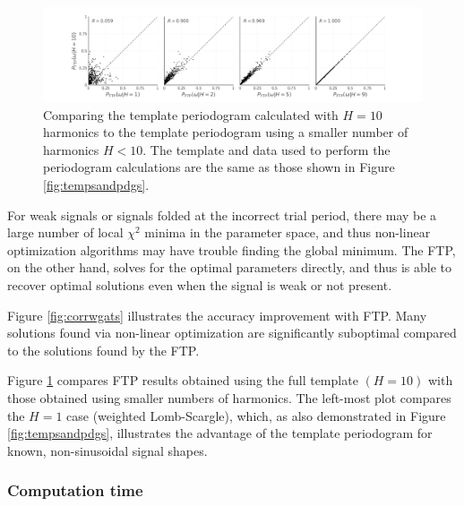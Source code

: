 \documentclass[apj]{emulateapj}
\begin{document}
\begin{figure}
    \centering
    \includegraphics[width=\textwidth]{plots/correlation_with_large_H.pdf}
    \caption{\label{fig:corrwhighh} Comparing the template periodogram calculated with $H=10$ harmonics
            to the template periodogram using a smaller number of harmonics $H < 10$. The template and
            data used to perform the periodogram calculations are the same as those shown in Figure \ref{fig:tempsandpdgs}.}    
\end{figure}

For weak signals or signals folded at the incorrect trial period, there
may be a large number of local $\chi^2$ minima in the parameter space, and thus
non-linear optimization algorithms may have trouble finding the global minimum. The 
FTP, on the other hand, solves for the optimal parameters directly, and
thus is able to recover optimal solutions even when the signal is weak
or not present.

Figure \ref{fig:corrwgats} illustrates the accuracy improvement with FTP.
Many solutions found via non-linear optimization are significantly suboptimal
compared to the solutions found by the FTP.

Figure \ref{fig:corrwhighh} compares FTP results obtained using the full template
$(H=10)$ with those obtained using smaller numbers of harmonics. The left-most
plot compares the $H=1$ case (weighted Lomb-Scargle), which, as also demonstrated
in Figure \ref{fig:tempsandpdgs}, illustrates the advantage of the template
periodogram for known, non-sinusoidal signal shapes.


\subsubsection{Computation time}
\end{document}
